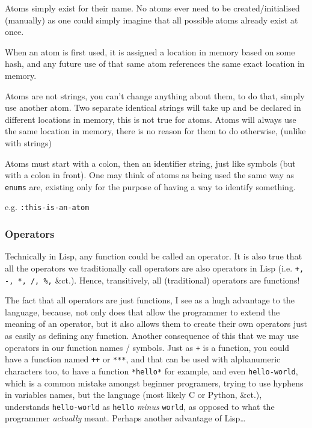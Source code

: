 \documentclass{article}
\newcommand{\code}[1]{\texttt{#1}}
\newcommand{\etc}{{\&}ct.}
\begin{document}
      Atoms simply exist for their name.
      No atoms ever need to be created/initialised (manually) as
      one could simply imagine that all
      possible atoms already exist at once.

      When an atom is first used, it is assigned
      a location in memory based on some hash, and
      any future use of that same atom
      references the same exact location in memory.

      Atoms are not strings, you can't change anything
      about them, to do that, simply use another atom.
      Two separate identical strings will take up and be
      declared in different locations in memory, this is
      not true for atoms. Atoms will always use the same
      location in memory, there is no reason for them to
      do otherwise, (unlike with strings)

      Atoms must start with a colon, then an identifier
      string, just like symbols (but with a colon in front).
      One may think of atoms as being used the same way
      as \code{enums} are, existing only for the purpose of
      having a way to identify something.\\

      \centerline{e.g. \code{:this-is-an-atom}}

    \subsubsection{Operators}
      Technically in Lisp, any function could be called an operator.
      It is also true that all the operators we traditionally call operators
      are also operators in Lisp (i.e. \code{+, -, *, /, \%,} \etc).
      Hence, transitively, all (traditional) operators are functions!

      The fact that all operators are just functions, I see as a hugh advantage
      to the language, because, not only does that allow the programmer to
      extend the meaning of an operator, but it also allows them to create their
      own operators just as easily as defining any function. Another consequence
      of this that we may use operators in our function names / symbols.
      Just as \code{+} is a function, you could have a function named \code{++}
      or \code{***}, and that can be used with alphanumeric characters too, to
      have a function \code{*hello*} for example, and even \code{hello-world},
      which is a common mistake amongst beginner programers, trying to use hyphens
      in variables names, but the language (most likely C or Python, \etc),
      understands \code{hello-world} as \code{hello} \emph{minus} \code{world},
      as opposed to what the programmer \emph{actually} meant. Perhaps another
      advantage of Lisp\ldots
\end{document}

